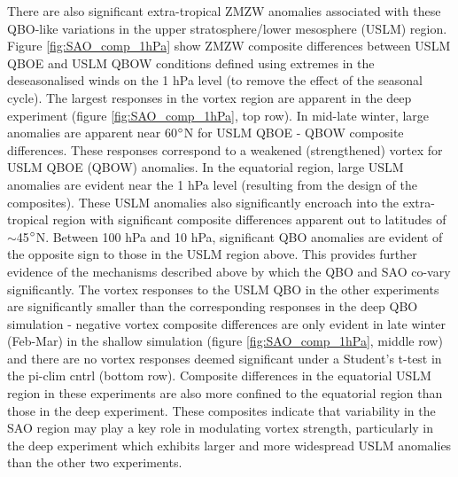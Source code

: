 There are also significant extra-tropical ZMZW anomalies associated with these QBO-like variations in the upper stratosphere/lower mesosphere (USLM) region. Figure \ref{fig:SAO_comp_1hPa} show ZMZW composite differences between USLM QBOE and USLM QBOW conditions defined using extremes in the deseasonalised winds on the 1 hPa level (to remove the effect of the seasonal cycle). The largest responses in the vortex region are apparent in the deep experiment (figure \ref{fig:SAO_comp_1hPa}, top row). In mid-late winter, large anomalies are apparent near 60$\degree$N for USLM QBOE - QBOW composite differences. These responses correspond to a weakened (strengthened) vortex for USLM QBOE (QBOW) anomalies. In the equatorial region, large USLM anomalies are evident near the 1 hPa level (resulting from the design of the composites). These USLM anomalies also significantly encroach into the extra-tropical region with significant composite differences apparent out to latitudes of $\sim$45$\degree$N. Between 100 hPa and 10 hPa, significant QBO anomalies are evident of the opposite sign to those in the USLM region above. This provides further evidence of the mechanisms described above by which the QBO and SAO co-vary significantly. The vortex responses to the USLM QBO in the other experiments are significantly smaller than the corresponding responses in the deep QBO simulation - negative vortex composite differences are only evident in late winter (Feb-Mar) in the shallow simulation (figure \ref{fig:SAO_comp_1hPa}, middle row) and there are no vortex responses deemed significant under a Student's t-test in the pi-clim cntrl (bottom row). Composite differences in the equatorial USLM region in these experiments are also more confined to the equatorial region than those in the deep experiment. These composites indicate that variability in the SAO region may play a key role in modulating vortex strength, particularly in the deep experiment which exhibits larger and more widespread USLM anomalies than the other two experiments.
\newpage

